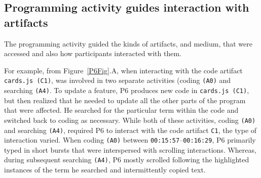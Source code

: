 \subsection{Programming activity guides interaction with artifacts}


The programming activity guided the kinds of artifacts, and medium, that were accessed and also how participants interacted with them.


For example, from Figure~\ref{P6Fig}.A, when interacting with the code artifact \texttt{cards.js (C1)}, was involved in two separate activities (coding \texttt{(A0)} and searching \texttt{(A4)}. To update a feature, P6 produces new code in \texttt{cards.js (C1)}, but then realized that he needed to update all the other parts of the program that were affected. He searched for the particular term within the code and switched back to coding as necessary. While both of these activities, coding \texttt{(A0)} and searching \texttt{(A4)}, required P6 to interact with the code artifact \texttt{C1}, the type of interaction varied. When coding \texttt{(A0)} between \texttt{00:15:57}--\texttt{00:16:29}, P6 primarily typed in short bursts that were interspersed with scrolling interactions. Whereas, during subsequent searching \texttt{(A4)}, P6 mostly scrolled following the highlighted instances of the term he searched and intermittently copied text.


